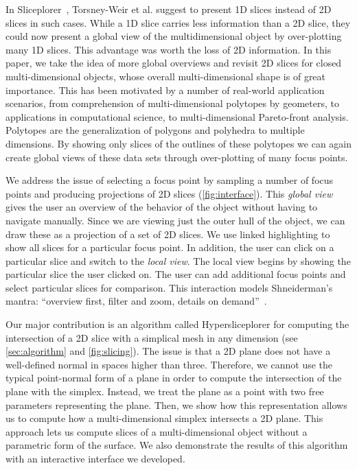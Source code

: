 In Sliceplorer~\cite{Torsney-Weir:2017a}, Torsney-Weir et al. suggest to
present 1D slices instead of 2D slices in such cases. While a 1D slice carries
less information than a 2D slice, they could now present a global view of the
multidimensional object by over-plotting many 1D slices. This advantage was
worth the loss of 2D information. In this paper, we take the idea of more global overviews and revisit 2D 
slices for closed multi-dimensional objects, whose overall multi-dimensional shape is
of great importance. This has been motivated by a number of real-world
application scenarios, from comprehension of multi-dimensional polytopes by 
geometers, to applications in computational science, to
multi-dimensional Pareto-front analysis. Polytopes are the generalization of polygons and polyhedra to multiple dimensions. By showing only slices of the outlines of these
polytopes we can again create global views of these data sets through
over-plotting of many focus points.


We address the issue of selecting a focus point by sampling a number of focus
points and producing projections of 2D slices (\autoref{fig:interface}). This
\emph{global view} gives the user an overview of the behavior of the object
without having to navigate manually. Since we are viewing just
the outer hull of the object, we can draw these as a projection of a set of 2D
slices.  We use linked highlighting to show all slices for a particular focus
point.  In addition, the user can click on a particular slice and switch to the
\emph{local view}. The local view begins by showing the particular slice the
user clicked on. The user can add additional focus points and select particular
slices for comparison. This interaction models Shneiderman's mantra: ``overview
first, filter and zoom, details on demand''~\cite{Shneiderman:1996}.

Our major contribution is an
algorithm called Hypersliceplorer for computing the intersection of a 2D slice with a simplical
mesh in any dimension (see \autoref{sec:algorithm} and \autoref{fig:slicing}). The issue is that a 2D plane does not have a
well-defined normal in spaces higher than three. Therefore, we cannot
use the typical point-normal form of a plane in order to compute the
intersection of the plane with the simplex. Instead, we treat the plane
as a point with two free parameters representing the plane. Then, we
show how this representation allows us to compute how a
multi-dimensional simplex intersects a 2D plane. This approach lets us compute
slices of a multi-dimensional object without a parametric form of the
surface. We also demonstrate the results of this algorithm with an interactive
interface we developed.

